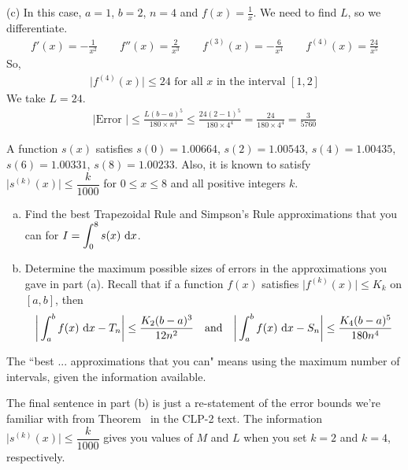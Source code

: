 \begin{solution}
\noindent (c)
In this case, $a=1$, $b=2$,
$n=4$ and $f(x)=\frac{1}{x}$. We need to find $L$, so we differentiate.
\begin{align*}
f'(x)=-\frac{1}{x^2}\qquad
f''(x)=\frac{2}{x^3}\qquad
f^{(3)}(x)=-\frac{6}{x^4}\qquad
f^{(4)}(x)=\frac{24}{x^5}
\end{align*}
So,
\begin{align*}
\big|f^{(4)}(x)\big|\le 24\text{ for all }x\text{ in the interval } [1,2]
\end{align*}
We take $L=24$.
\begin{align*}
|\text{Error }|\le \frac{L(b-a)^5}{180\times n^4}
\le \frac{24(2-1)^5}{180\times 4^4}=\frac{24}{180\times 4^4}=\frac{3}{5760}
\end{align*}


\end{solution}


\begin{question}[M121 2000A]\label{prob_s.1.11_error2}
A function $s(x)$ satisfies $s(0)=1.00664$, $s(2)=1.00543$,
$s(4)=1.00435$, $s(6)=1.00331$, $s(8)=1.00233$. Also, it is known to satisfy
$\big|s^{(k)}(x)\big|\le \dfrac{k}{1000}$ for $0\le x\le 8$ and all positive
integers $k$.

\begin{enumerate}[(a)]
\item
Find the best Trapezoidal Rule and Simpson's Rule approximations
that you can for $\displaystyle I=\int_0^8 s(x)\ \mathrm{d}x$.

\item
Determine the maximum possible sizes of errors in the approximations
you gave in part (a). Recall that if a function $f(x)$ satisfies
$\big|f^{(k)}(x)\big|\le K_k$ on $[a,b]$, then
\begin{equation*}
\bigg|\int_a^b f(x)\ \mathrm{d}x -T_n\bigg|\le \frac{K_2(b-a)^3}{12n^2}
\quad\hbox{and}\quad
\bigg|\int_a^b f(x)\ \mathrm{d}x -S_n\bigg|\le \frac{K_4(b-a)^5}{180n^4}
\end{equation*}
\end{enumerate}
\end{question}

\begin{hint}
The ``best ... approximations that you can" means using the maximum number of intervals, given the information available.

The final sentence in part (b) is just a re-statement of the error bounds we're familiar with from Theorem~ in the CLP-2 text. The information $\big|s^{(k)}(x)\big|\le \dfrac{k}{1000}$ gives you values of $M$ and $L$ when you set $k=2$ and $k=4$, respectively.
\end{hint}

